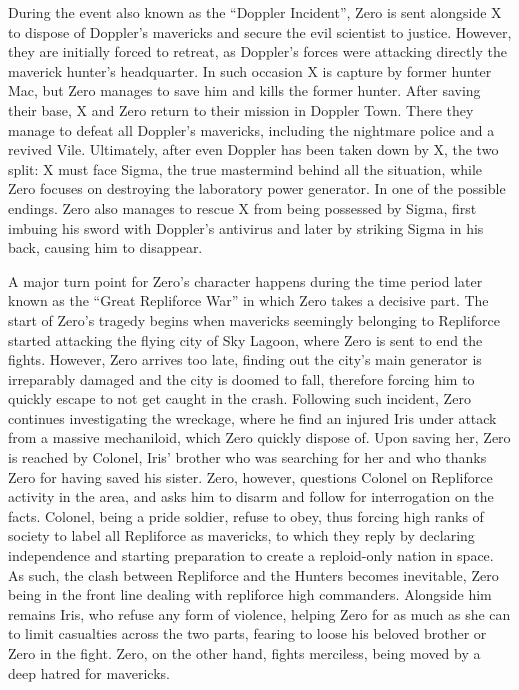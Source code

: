 During the event also known as the ``Doppler Incident'', Zero is sent alongside X to dispose of Doppler's mavericks and secure the evil scientist to justice. However, they are initially forced to retreat, as Doppler's forces were attacking directly the maverick hunter's headquarter. In such occasion X is capture by former hunter Mac, but Zero manages to save him and kills the former hunter. After saving their base, X and Zero return to their mission in Doppler Town. There they manage to defeat all Doppler's mavericks, including the nightmare police and a revived Vile. Ultimately, after even Doppler has been taken down by X, the two split: X must face Sigma, the true mastermind behind all the situation, while Zero focuses on destroying the laboratory power generator. In one of the possible endings. Zero also manages to rescue X from being possessed by Sigma, first imbuing his sword with Doppler's antivirus and later by striking Sigma in his back, causing him to disappear.

A major turn point for Zero's character happens during the time period later known as the ``Great Repliforce War'' in which Zero takes a decisive part. The start of Zero's tragedy begins when mavericks seemingly belonging to Repliforce started attacking the flying city of Sky Lagoon, where Zero is sent to end the fights. However, Zero arrives too late, finding out the city's main generator is irreparably damaged and the city is doomed to fall, therefore forcing him to quickly escape to not get caught in the crash. Following such incident, Zero continues investigating the wreckage, where he find an injured Iris under attack from a massive mechaniloid, which Zero quickly dispose of. Upon saving her, Zero is reached by Colonel, Iris' brother who was searching for her and who thanks Zero for having saved his sister. Zero, however, questions Colonel on Repliforce activity in the area, and asks him to disarm and follow for interrogation on the facts. Colonel, being a pride soldier, refuse to obey, thus forcing high ranks of society to label all Repliforce as mavericks, to which they reply by declaring independence and starting preparation to create a reploid-only nation in space. As such, the clash between Repliforce and the Hunters becomes inevitable, Zero being in the front line dealing with repliforce high commanders. Alongside him remains Iris, who refuse any form of violence, helping Zero for as much as she can to limit casualties across the two parts, fearing to loose his beloved brother or Zero in the fight. Zero, on the other hand, fights merciless, being moved by a deep hatred for mavericks.

